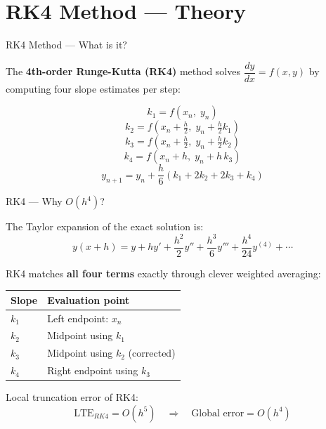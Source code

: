 \documentclass{beamer}
\begin{document}
\section{RK4 Method — Theory}

\begin{frame}{RK4 Method — What is it?}

The \textbf{4th-order Runge-Kutta (RK4)} method solves $\dfrac{dy}{dx} = f(x,y)$ by computing four slope estimates per step:

\begin{equation}
    k_1 = f(x_n,\; y_n)
\end{equation}
\begin{equation}
    k_2 = f\!\left(x_n + \tfrac{h}{2},\; y_n + \tfrac{h}{2}k_1\right)
\end{equation}
\begin{equation}
    k_3 = f\!\left(x_n + \tfrac{h}{2},\; y_n + \tfrac{h}{2}k_2\right)
\end{equation}
\begin{equation}
    k_4 = f\!\left(x_n + h,\; y_n + h\,k_3\right)
\end{equation}
\begin{equation}
    \boxed{y_{n+1} = y_n + \frac{h}{6}\!\left(k_1 + 2k_2 + 2k_3 + k_4\right)}
\end{equation}

\end{frame}

\begin{frame}{RK4 — Why $O(h^4)$?}

The Taylor expansion of the exact solution is:
\[
    y(x+h) = y + h y' + \frac{h^2}{2}y'' + \frac{h^3}{6}y''' + \frac{h^4}{24}y^{(4)} + \cdots
\]

RK4 matches \textbf{all four terms} exactly through clever weighted averaging:

\vspace{0.3cm}
\begin{tabular}{ll}
    \toprule
    Slope & Evaluation point \\
    \midrule
    $k_1$ & Left endpoint: $x_n$ \\
    $k_2$ & Midpoint using $k_1$ \\
    $k_3$ & Midpoint using $k_2$ (corrected) \\
    $k_4$ & Right endpoint using $k_3$ \\
    \bottomrule
\end{tabular}

\vspace{0.3cm}
Local truncation error of RK4:
\begin{equation}
    \text{LTE}_{RK4} = O(h^5) \quad \Rightarrow \quad \text{Global error} = O(h^4)
\end{equation}

\end{frame}
\end{document}
